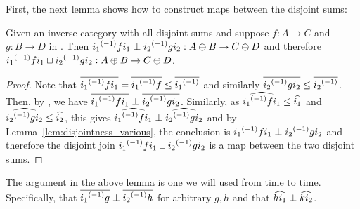 First, the next lemma shows how to construct maps between the disjoint sums:
\begin{lemma}\label{lem:disjoint_sum_maps_are_perp}
  Given \X an inverse category with all disjoint sums and suppose $f:A \to C$ and $g:B\to D$ in
  \X. Then  ${i_1}^{(-1)} f i_1 \perp {i_2}^{(-1)} g i_2 : A\oplus B\to C\oplus D$ and therefore
  ${i_1}^{(-1)} f i_1 \sqcup {i_2}^{(-1)} g i_2 : A\oplus B\to C\oplus D$.
\end{lemma}
\begin{proof}
  Note that $\overline{{i_1}^{(-1)} f i_1} = \overline{{i_1}^{(-1)} f} \le \overline{{i_1}^{(-1)}}$ and similarly
  $\overline{{i_2}^{(-1)} g i_2} \le \overline{{i_2}^{(-1)}}$. Then, by , we have
  $\overline{{i_1}^{(-1)} f i_1} \perp \overline{{i_2}^{(-1)} g i_2}$.
  Similarly, as $\widehat{{i_1}^{(-1)} f i_1} \le \widehat{i_1}$ and  $\widehat{{i_2}^{(-1)} g i_2} \le \widehat{i_2}$,
  this gives $\widehat{{i_1}^{(-1)} f i_1} \perp \widehat{{i_2}^{(-1)} g i_2}$ and by
  Lemma~\ref{lem:disjointness_various}, the conclusion is ${i_1}^{(-1)} f i_1\perp {i_2}^{(-1)} g i_2$
  and therefore the disjoint join ${i_1}^{(-1)} f i_1 \sqcup {i_2}^{(-1)} g i_2$ is a map between the two
  disjoint sums.
\end{proof}

The argument in the above lemma is one we will used from time to time. Specifically, that
$\overline{{i_1}^{(-1)} g} \perp \overline{{i_2}^{(-1)} h}$ for arbitrary $g,h$ and that
$\widehat{h i_1} \perp \widehat{k i_2}$.

